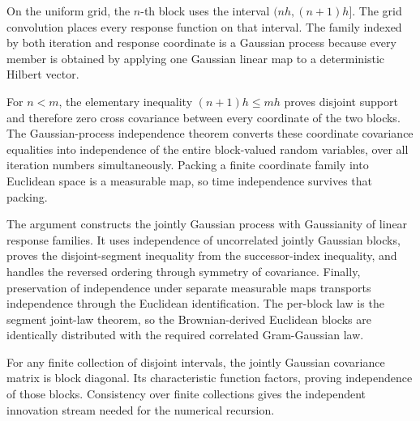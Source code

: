 \documentclass[11pt,a4paper]{article}
\begin{document}
On the uniform grid, the \(n\)-th block uses the interval \((nh,(n+1)h]\). The grid convolution places every response function on that interval. The family indexed by both iteration and response coordinate is a Gaussian process because every member is obtained by applying one Gaussian linear map to a deterministic Hilbert vector.



For \(n<m\), the elementary inequality \((n+1)h\le mh\) proves disjoint support and therefore zero cross covariance between every coordinate of the two blocks. The Gaussian-process independence theorem converts these coordinate covariance equalities into independence of the entire block-valued random variables, over all iteration numbers simultaneously. Packing a finite coordinate family into Euclidean space is a measurable map, so time independence survives that packing.



The argument constructs the jointly Gaussian process with Gaussianity of linear response families. It uses independence of uncorrelated jointly Gaussian blocks, proves the disjoint-segment inequality from the successor-index inequality, and handles the reversed ordering through symmetry of covariance. Finally, preservation of independence under separate measurable maps transports independence through the Euclidean identification. The per-block law is the segment joint-law theorem, so the Brownian-derived Euclidean blocks are identically distributed with the required correlated Gram-Gaussian law.



For any finite collection of disjoint intervals, the jointly Gaussian covariance matrix is block diagonal. Its characteristic function factors, proving independence of those blocks. Consistency over finite collections gives the independent innovation stream needed for the numerical recursion.
\end{document}
